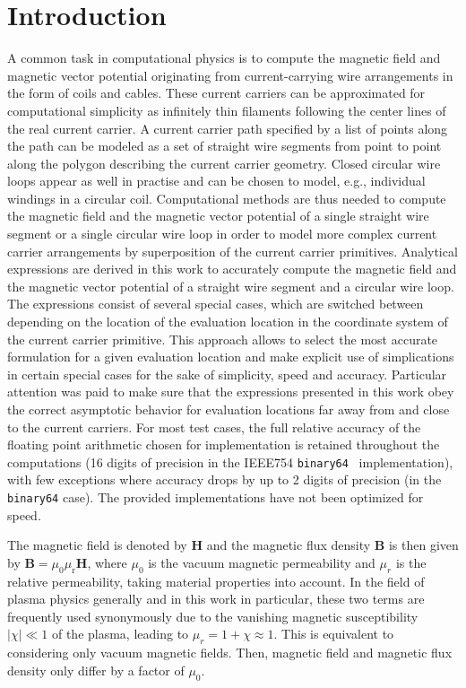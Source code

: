 \section{Introduction}
\label{sec:introduction}
A common task in computational physics is to compute the magnetic field and magnetic vector potential
originating from current-carrying wire arrangements in the form of coils and cables.
These current carriers can be approximated for computational simplicity as infinitely thin filaments
following the center lines of the real current carrier.
A current carrier path specified by a list of points along the path
can be modeled as a set of straight wire segments from point to point along the polygon describing the current carrier geometry.
Closed circular wire loops appear as well in practise and can be chosen to model, e.g.,
individual windings in a circular coil.
Computational methods are thus needed to compute the magnetic field and the magnetic vector potential
of a single straight wire segment or a single circular wire loop
in order to model more complex current carrier arrangements
by superposition of the current carrier primitives.
Analytical expressions are derived in this work to accurately compute
the magnetic field and the magnetic vector potential of a straight wire segment
and a circular wire loop. The expressions consist of several special cases,
which are switched between depending on the location of the evaluation location
in the coordinate system of the current carrier primitive.
This approach allows to select the most accurate formulation
for a given evaluation location and make explicit use of simplications
in certain special cases for the sake of simplicity, speed and accuracy.
Particular attention was paid to make sure that the expressions presented in this work
obey the correct asymptotic behavior for evaluation locations
far away from and close to the current carriers.
For most test cases, the full relative accuracy of the floating point
arithmetic chosen for implementation is retained throughout the computations
(16 digits of precision in the IEEE754 \texttt{binary64}~\cite{ieee754} implementation),
with few exceptions where accuracy drops by up to 2 digits of precision
(in the \texttt{binary64} case).
The provided implementations have not been optimized for speed.

The magnetic field is denoted by $\mathbf{H}$ and
the magnetic flux density $\mathbf{B}$ is then given by $\mathbf{B} = \mu_0 \mu_\mathrm{r} \mathbf{H}$,
where $\mu_0$ is the vacuum magnetic permeability
and $\mu_r$ is the relative permeability, taking material properties into account.
In the field of plasma physics generally and in this work in particular,
these two terms are frequently used synonymously
due to the vanishing magnetic susceptibility $|\chi| \ll 1$ of the plasma,
leading to $\mu_r = 1+\chi \approx 1$.
This is equivalent to considering only vacuum magnetic fields.
Then, magnetic field and magnetic flux density only differ by a factor of $\mu_0$.
